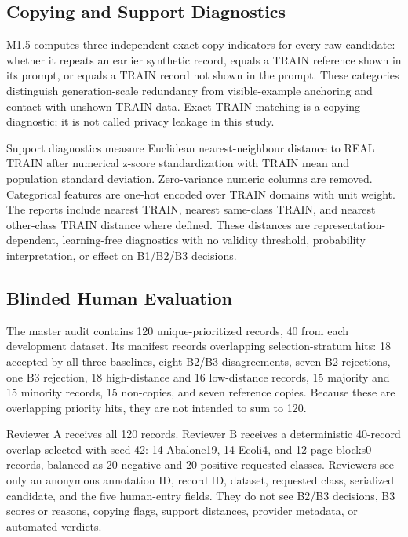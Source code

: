 \subsection{Copying and Support Diagnostics}
\label{sec:diagnostics}

M1.5 computes three independent exact-copy indicators for every raw candidate:
whether it repeats an earlier synthetic record, equals a TRAIN reference shown
in its prompt, or equals a TRAIN record not shown in the prompt. These
categories distinguish generation-scale redundancy from visible-example
anchoring and contact with unshown TRAIN data. Exact TRAIN matching is a
copying diagnostic; it is not called privacy leakage in this study.

Support diagnostics measure Euclidean nearest-neighbour distance to REAL TRAIN
after numerical z-score standardization with TRAIN mean and population
standard deviation. Zero-variance numeric columns are removed. Categorical
features are one-hot encoded over TRAIN domains with unit weight. The reports
include nearest TRAIN, nearest same-class TRAIN, and nearest other-class TRAIN
distance where defined. These distances are representation-dependent,
learning-free diagnostics with no validity threshold, probability
interpretation, or effect on B1/B2/B3 decisions.

\subsection{Blinded Human Evaluation}
\label{sec:human-evaluation}

The master audit contains 120 unique-prioritized records, 40 from each
development dataset. Its manifest records overlapping selection-stratum hits:
18 accepted by all three baselines, eight B2/B3 disagreements, seven B2
rejections, one B3 rejection, 18 high-distance and 16 low-distance records, 15
majority and 15 minority records, 15 non-copies, and seven reference copies.
Because these are overlapping priority hits, they are not intended to sum to
120.

Reviewer A receives all 120 records. Reviewer B receives a deterministic
40-record overlap selected with seed 42: 14 Abalone19, 14 Ecoli4, and 12
page-blocks0 records, balanced as 20 negative and 20 positive requested
classes. Reviewers see only an anonymous annotation ID, record ID, dataset,
requested class, serialized candidate, and the five human-entry fields. They
do not see B2/B3 decisions, B3 scores or reasons, copying flags, support
distances, provider metadata, or automated verdicts.

